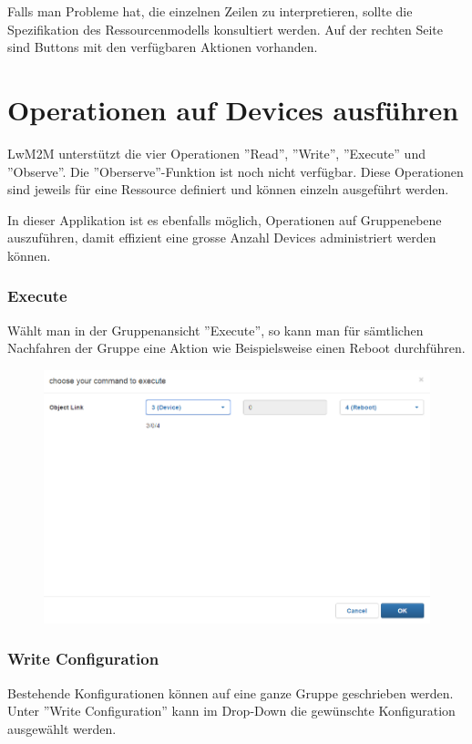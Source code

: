 Falls man Probleme hat, die einzelnen Zeilen zu interpretieren, sollte die Spezifikation des Ressourcenmodells konsultiert werden. Auf der rechten Seite sind Buttons mit den verfügbaren Aktionen vorhanden.

\section{Operationen auf Devices ausführen}
LwM2M unterstützt die vier Operationen ''Read'', ''Write'', ''Execute'' und ''Observe''. Die ''Oberserve''-Funktion ist noch nicht verfügbar. Diese Operationen sind jeweils für eine Ressource definiert und können einzeln ausgeführt werden.

In dieser Applikation ist es ebenfalls möglich, Operationen auf Gruppenebene auszuführen, damit effizient eine grosse Anzahl Devices administriert werden können.

\subsubsection{Execute}
Wählt man in der Gruppenansicht ''Execute'', so kann man für sämtlichen Nachfahren der Gruppe eine Aktion wie Beispielsweise einen Reboot durchführen.

\begin{figure}[H]
\includegraphics[scale=0.57]{../05_Schlussbericht/images/benutzeranleitung/reboot.png}
\end{figure}

\subsubsection{Write Configuration}
Bestehende Konfigurationen können auf eine ganze Gruppe geschrieben werden. Unter ''Write Configuration'' kann im Drop-Down die gewünschte Konfiguration ausgewählt werden.

